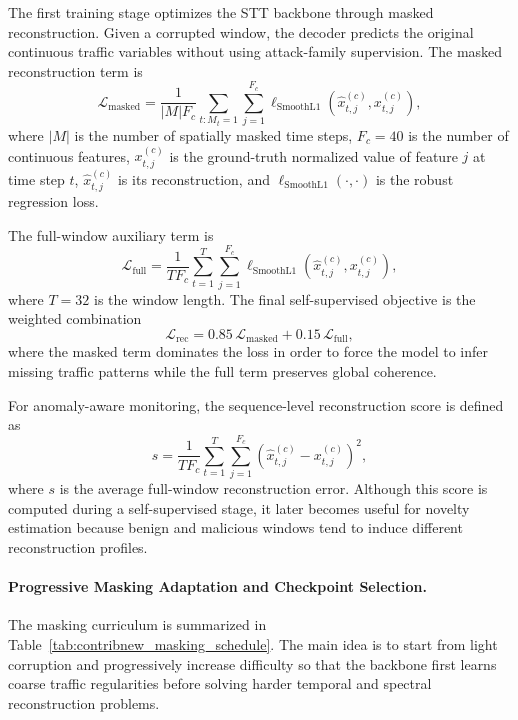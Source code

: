 \documentclass[12pt, a4paper]{report}
\begin{document}
The first training stage optimizes the STT backbone through masked reconstruction. Given a corrupted window, the decoder predicts the original continuous traffic variables without using attack-family supervision. The masked reconstruction term is
\begin{equation}
\mathcal{L}_{\mathrm{masked}} = \frac{1}{|M|F_c}
\sum_{t: M_t=1}\sum_{j=1}^{F_c}
\ell_{\mathrm{SmoothL1}}\left(\hat{x}_{t,j}^{(c)}, x_{t,j}^{(c)}\right),
\end{equation}
where $|M|$ is the number of spatially masked time steps, $F_c=40$ is the number of continuous features, $x_{t,j}^{(c)}$ is the ground-truth normalized value of feature $j$ at time step $t$, $\hat{x}_{t,j}^{(c)}$ is its reconstruction, and $\ell_{\mathrm{SmoothL1}}(\cdot,\cdot)$ is the robust regression loss.

The full-window auxiliary term is
\begin{equation}
\mathcal{L}_{\mathrm{full}} = \frac{1}{TF_c}
\sum_{t=1}^{T}\sum_{j=1}^{F_c}
\ell_{\mathrm{SmoothL1}}\left(\hat{x}_{t,j}^{(c)}, x_{t,j}^{(c)}\right),
\end{equation}
where $T=32$ is the window length. The final self-supervised objective is the weighted combination
\begin{equation}
\mathcal{L}_{\mathrm{rec}} = 0.85\,\mathcal{L}_{\mathrm{masked}} + 0.15\,\mathcal{L}_{\mathrm{full}},
\end{equation}
where the masked term dominates the loss in order to force the model to infer missing traffic patterns while the full term preserves global coherence.

For anomaly-aware monitoring, the sequence-level reconstruction score is defined as
\begin{equation}
s = \frac{1}{TF_c}\sum_{t=1}^{T}\sum_{j=1}^{F_c}
\left(\hat{x}_{t,j}^{(c)} - x_{t,j}^{(c)}\right)^2,
\end{equation}
where $s$ is the average full-window reconstruction error. Although this score is computed during a self-supervised stage, it later becomes useful for novelty estimation because benign and malicious windows tend to induce different reconstruction profiles.
\paragraph{Progressive Masking Adaptation and Checkpoint Selection.}
The masking curriculum is summarized in Table~\ref{tab:contribnew_masking_schedule}. The main idea is to start from light corruption and progressively increase difficulty so that the backbone first learns coarse traffic regularities before solving harder temporal and spectral reconstruction problems.
\end{document}
